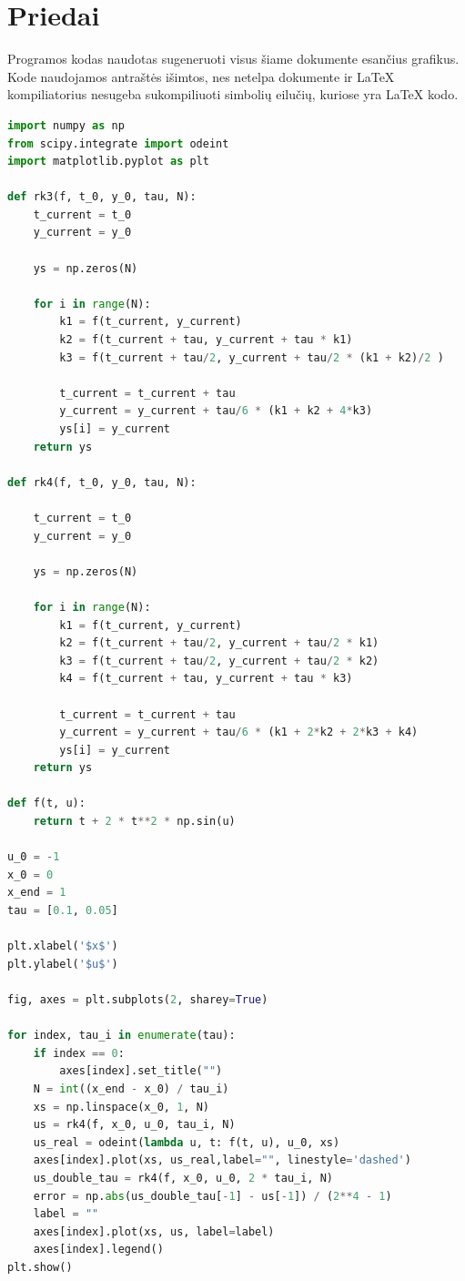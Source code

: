 \documentclass[11pt]{article}
\begin{document}
\newpage
\section{Priedai}

Programos kodas naudotas sugeneruoti visus šiame dokumente esančius grafikus. Kode naudojamos antraštės išimtos, nes
netelpa dokumente ir LaTeX kompiliatorius nesugeba sukompiliuoti simbolių eilučių, kuriose yra LaTeX kodo. 

\begin{lstlisting}[language=Python]
import numpy as np
from scipy.integrate import odeint
import matplotlib.pyplot as plt

def rk3(f, t_0, y_0, tau, N):
    t_current = t_0
    y_current = y_0

    ys = np.zeros(N)

    for i in range(N):
        k1 = f(t_current, y_current)
        k2 = f(t_current + tau, y_current + tau * k1)
        k3 = f(t_current + tau/2, y_current + tau/2 * (k1 + k2)/2 )
        
        t_current = t_current + tau
        y_current = y_current + tau/6 * (k1 + k2 + 4*k3)
        ys[i] = y_current
    return ys

def rk4(f, t_0, y_0, tau, N):

    t_current = t_0
    y_current = y_0

    ys = np.zeros(N)

    for i in range(N):
        k1 = f(t_current, y_current)
        k2 = f(t_current + tau/2, y_current + tau/2 * k1)
        k3 = f(t_current + tau/2, y_current + tau/2 * k2)
        k4 = f(t_current + tau, y_current + tau * k3)

        t_current = t_current + tau
        y_current = y_current + tau/6 * (k1 + 2*k2 + 2*k3 + k4)
        ys[i] = y_current
    return ys

def f(t, u):
    return t + 2 * t**2 * np.sin(u)

u_0 = -1
x_0 = 0
x_end = 1
tau = [0.1, 0.05]

plt.xlabel('$x$')
plt.ylabel('$u$')

fig, axes = plt.subplots(2, sharey=True)

for index, tau_i in enumerate(tau):
    if index == 0:
        axes[index].set_title("")
    N = int((x_end - x_0) / tau_i)
    xs = np.linspace(x_0, 1, N)
    us = rk4(f, x_0, u_0, tau_i, N)
    us_real = odeint(lambda u, t: f(t, u), u_0, xs)
    axes[index].plot(xs, us_real,label="", linestyle='dashed')
    us_double_tau = rk4(f, x_0, u_0, 2 * tau_i, N)
    error = np.abs(us_double_tau[-1] - us[-1]) / (2**4 - 1)
    label = ""
    axes[index].plot(xs, us, label=label)
    axes[index].legend()
plt.show()


\end{lstlisting}
\end{document}
